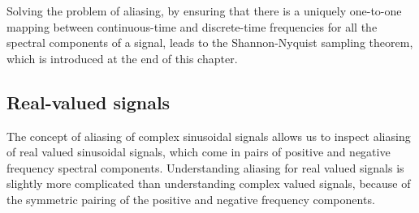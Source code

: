 Solving the problem of aliasing, by ensuring that there is a uniquely one-to-one mapping between continuous-time and discrete-time frequencies 
for all the spectral components of a signal, leads to the Shannon-Nyquist sampling theorem, which is introduced at the end of this chapter.

\subsection{Real-valued signals}
The concept of aliasing of complex sinusoidal signals allows us to inspect aliasing of real valued sinusoidal signals, which come in pairs of positive and negative frequency spectral components. 
Understanding aliasing for real valued signals is slightly more complicated than understanding complex valued signals, because of the symmetric pairing of the positive and negative frequency components.

